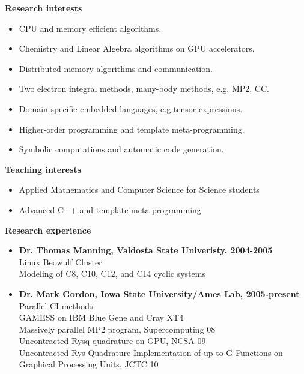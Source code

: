 \documentclass[10pt,oneside]{article}
\begin{document}
{  \normalsize
  \textbf{Research interests}\\
  \small
  \begin {itemize}
    \item CPU and memory efficient algorithms.
    \item Chemistry and Linear Algebra algorithms on GPU accelerators.
    \item Distributed memory algorithms and communication. 
    \item Two electron integral methods, many-body methods, e.g. MP2, CC.
    \item Domain specific embedded languages, e.g tensor expressions.
    \item Higher-order programming and template  meta-programming.
    \item Symbolic computations and automatic code generation.
  \end {itemize}

  \normalsize
  \textbf{Teaching interests}
  \small
  \begin{itemize}
  \item{Applied Mathematics and Computer Science for Science students}
  \item{Advanced C++ and template meta-programming}
  \end{itemize}
  
  \normalsize
  \textbf{Research experience}
  \small
  \begin{itemize}
  \item{\textbf{Dr. Thomas Manning, Valdosta State Univeristy, 2004-2005}} \\
    Linux Beowulf Cluster \\
    Modeling of C8, C10, C12, and C14 cyclic systems
  \item{\textbf{Dr. Mark Gordon, Iowa State University/Ames Lab, 2005-present}} \\
    Parallel CI methods \\
    GAMESS on IBM Blue Gene and Cray XT4 \\
    Massively parallel MP2 program, Supercomputing 08 \\
    Uncontracted Rysq quadrature on GPU, NCSA 09 \\
    Uncontracted Rys Quadrature Implementation of up to G Functions on Graphical Processing Units, JCTC 10
  \end{itemize}

}
\end{document}
